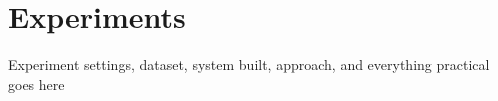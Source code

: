 \chapter{Experiments}
\label{chapter:Experiments}

Experiment settings, dataset, system built, approach, and everything practical goes here
